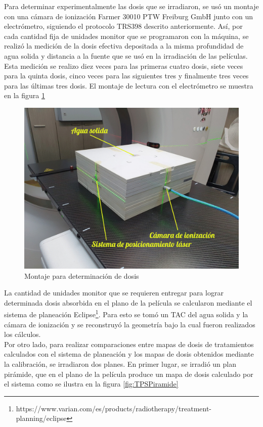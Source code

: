 Para determinar experimentalmente las dosis que se irradiaron, se usó un montaje con una cámara de ionización Farmer 30010 PTW Freiburg GmbH junto con un electrómetro, siguiendo el protocolo TRS398 descrito anteriormente. Así, por cada cantidad fija de unidades monitor que se programaron con la máquina, se realizó la medición de la dosis efectiva depositada a la misma profundidad de agua solida y distancia a la fuente que se usó en la irradiación de las películas. Esta medición se realizo diez veces para las primeras cuatro dosis, siete veces para la quinta dosis, cinco veces para las siguientes tres y finalmente tres veces para las últimas tres dosis. El montaje de lectura con el electrómetro se muestra en la figura \ref{fig:Montajeelectrometro}\\
\begin{figure}[H]
	\centering
	\includegraphics[width=0.7\linewidth]{images/elctrometro.jpg}
	
	\caption{Montaje para determinación de dosis}
	\label{fig:Montajeelectrometro}
\end{figure}

La cantidad de unidades monitor que se requieren entregar para lograr determinada dosis absorbida en el plano de la película se calcularon mediante el sistema de planeación Eclipse\footnote{https://www.varian.com/es/products/radiotherapy/treatment-planning/eclipse}. Para esto se tomó un TAC del agua solida y la cámara de ionización y se reconstruyó la geometría bajo la cual fueron realizados los cálculos.\\

Por otro lado, para realizar comparaciones entre mapas de dosis de tratamientos calculados con el sistema de planeación y los mapas de dosis obtenidos mediante la calibración, se irradiaron dos planes. En primer lugar, se irradió un plan pirámide, que en el plano de la película produce un mapa de dosis calculado por el sistema como se ilustra en la figura \ref{fig:TPSPiramide}\\

